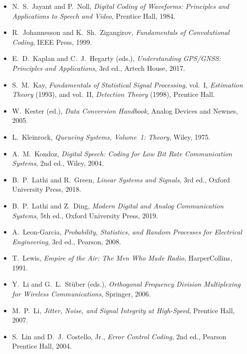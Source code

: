 \begin{itemize}[leftmargin=1.5em,itemindent=-1.5em,itemsep=1.5pt plus 1pt,parsep=0pt,topsep=4pt,label={}]
\item N.~S.~Jayant and P.~Noll, \emph{Digital Coding of Waveforms: Principles and Applications to Speech and Video}, Prentice Hall, 1984.
\item R.~Johannesson and K.~Sh.~Zigangirov, \emph{Fundamentals of Convolutional Coding}, IEEE Press, 1999.
\item E.~D.~Kaplan and C.~J.~Hegarty (eds.), \emph{Understanding GPS/GNSS: Principles and Applications}, 3rd ed., Artech House, 2017.
\item S.~M.~Kay, \emph{Fundamentals of Statistical Signal Processing}, vol.~I, \emph{Estimation Theory} (1993), and vol.~II, \emph{Detection Theory} (1998), Prentice Hall.
\item W.~Kester (ed.), \emph{Data Conversion Handbook}, Analog Devices and Newnes, 2005.
\item L.~Kleinrock, \emph{Queueing Systems, Volume~1: Theory}, Wiley, 1975.
\item A.~M.~Kondoz, \emph{Digital Speech: Coding for Low Bit Rate Communication Systems}, 2nd ed., Wiley, 2004.
\item B.~P.~Lathi and R.~Green, \emph{Linear Systems and Signals}, 3rd ed., Oxford University Press, 2018.
\item B.~P.~Lathi and Z.~Ding, \emph{Modern Digital and Analog Communication Systems}, 5th ed., Oxford University Press, 2019.
\item A.~Leon-Garcia, \emph{Probability, Statistics, and Random Processes for Electrical Engineering}, 3rd ed., Pearson, 2008.
\item T.~Lewis, \emph{Empire of the Air: The Men Who Made Radio}, HarperCollins, 1991.
\item Y.~Li and G.~L.~St\"uber (eds.), \emph{Orthogonal Frequency Division Multiplexing for Wireless Communications}, Springer, 2006.
\item M.~P.~Li, \emph{Jitter, Noise, and Signal Integrity at High-Speed}, Prentice Hall, 2007.
\item S.~Lin and D.~J.~Costello, Jr., \emph{Error Control Coding}, 2nd ed., Pearson Prentice Hall, 2004.

\end{itemize}
